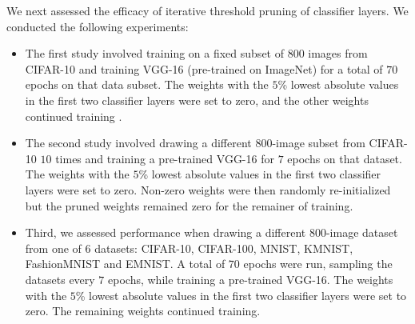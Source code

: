 \documentclass{article}
\begin{document}
We next assessed the efficacy of iterative threshold pruning of classifier layers. We conducted the following experiments:
\begin{itemize}
	\item The first study involved training on a fixed subset of $800$ images from CIFAR-10 and training VGG-16 (pre-trained on ImageNet) for a total of $70$ epochs on that data subset. The weights with the $5$\% lowest absolute values in the first two classifier layers were set to zero, and the other weights continued training
.
	\item The second study involved drawing a different $800$-image subset from CIFAR-10 $10$ times and training a pre-trained VGG-16 for $7$ epochs on that dataset. The weights with the $5$\% lowest absolute values in the first two classifier layers were set to zero. Non-zero weights were then randomly re-initialized but the pruned weights remained zero for the remainer of training.

	\item Third, we assessed performance when drawing a different $800$-image dataset from one of $6$ datasets: CIFAR-10, CIFAR-100, MNIST, KMNIST, FashionMNIST and EMNIST. A total of $70$ epochs were run, sampling the datasets every $7$ epochs, while training a pre-trained VGG-16. The weights with the $5$\% lowest absolute values in the first two classifier layers were set to zero. The remaining weights continued training.

\end{itemize}
\end{document}
